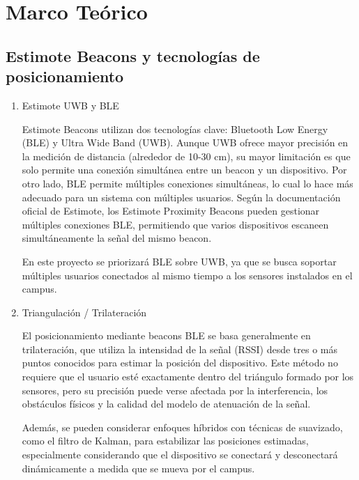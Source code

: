 \documentclass{article}
\begin{document}
\newpage
\section{Marco Teórico}
\subsection{Estimote Beacons y tecnologías de posicionamiento}
\begin{enumerate}[label=\thesubsection.\arabic*]
\item  Estimote UWB y BLE  

Estimote Beacons utilizan dos tecnologías clave: Bluetooth Low Energy (BLE) y Ultra Wide Band (UWB). Aunque UWB ofrece mayor precisión en la medición de distancia (alrededor de 10-30 cm), su mayor limitación es que solo permite una conexión simultánea entre un beacon y un dispositivo.
Por otro lado, BLE permite múltiples conexiones simultáneas, lo cual lo hace más adecuado para un sistema con múltiples usuarios. Según la documentación oficial de Estimote, los Estimote Proximity Beacons pueden gestionar múltiples conexiones BLE, permitiendo que varios dispositivos escaneen simultáneamente la señal del mismo beacon.

En este proyecto se priorizará BLE sobre UWB, ya que se busca soportar múltiples usuarios conectados al mismo tiempo a los sensores instalados en el campus.

\item Triangulación / Trilateración

El posicionamiento mediante beacons BLE se basa generalmente en trilateración, que utiliza la intensidad de la señal (RSSI) desde tres o más puntos conocidos para estimar la posición del dispositivo.
Este método no requiere que el usuario esté exactamente dentro del triángulo formado por los sensores, pero su precisión puede verse afectada por la interferencia, los obstáculos físicos y la calidad del modelo de atenuación de la señal.

Además, se pueden considerar enfoques híbridos con técnicas de suavizado, como el filtro de Kalman, para estabilizar las posiciones estimadas, especialmente considerando que el dispositivo se conectará y desconectará dinámicamente a medida que se mueva por el campus.
\end{enumerate}
\end{document}
